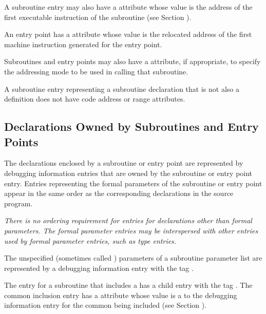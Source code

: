 A\hypertarget{chap:DWATentrypcentryaddressofsubprogram}{}
subroutine entry may also have a
\DWATentrypc{} attribute
whose value is the address of the first executable instruction
of the subroutine (see 
Section ).

An entry point has a \DWATlowpc{} attribute whose value is the
relocated address of the first machine instruction generated
for the entry point.


Subroutines and entry points may also have
\bb
a \DWATaddressclassDEFN{}
attribute, if 
\eb
appropriate, to specify
\db
the addressing mode to be used in calling that subroutine.

A subroutine entry representing a subroutine declaration
that is not also a definition does not have code address or
range attributes.


\subsection{Declarations Owned by Subroutines and Entry Points} 
\label{chap:declarationsownedbysubroutinesandentrypoints}
The declarations enclosed by a subroutine or entry point are
represented by debugging information entries that are owned
by the subroutine or entry point entry. Entries representing
the formal parameters of the subroutine or entry point appear
in the same order as the corresponding declarations in the
source program.

\textit{There is no ordering requirement for entries for declarations
other than formal parameters. The formal parameter
entries may be interspersed with other entries used by formal
parameter entries, such as type entries.}

The unspecified (sometimes called ) 
parameters of a subroutine parameter list are
represented by a debugging information 
entry
with the tag \DWTAGunspecifiedparametersTARG.

The entry for a subroutine that includes a
has a child entry with the 
tag \DWTAGcommoninclusionTARG. 
The\hypertarget{chap:commonreferencecommonblockusage}{}
common inclusion entry has a 
\DWATcommonreferenceDEFN{} attribute
whose value is a  
to the debugging information entry
for the common  being included 
(see Section ).

